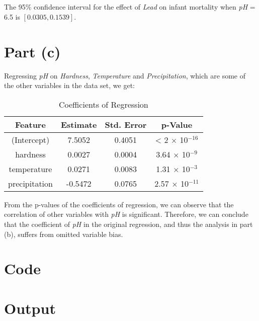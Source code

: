 \documentclass{./solution}
\begin{document}
\begin{solution}
            \subsection{}
                The 95\% confidence interval for the effect of \textit{Lead} on infant mortality when \textit{pH} = 6.5 is $[0.0305, 0.1539]$.

        \section{Part (c)}
            Regressing \textit{pH} on \textit{Hardness}, \textit{Temperature} and \textit{Precipitation}, which are some of the other variables in the data set, we get:

            \begin{table}[H]
                \caption{Coefficients of Regression}
                \begin{tabularx}{\textwidth}{C C C C}
                    \toprule
                    Feature & Estimate & Std. Error & p-Value \\
                    \midrule
                    (Intercept)   &  7.5052 & 0.4051 &  < 2 $\times$ 10$^{-16}$ \\
                    hardness      &  0.0027 & 0.0004 & 3.64 $\times$ 10$^{-9}$ \\
                    temperature   &  0.0271 & 0.0083 & 1.31 $\times$ 10$^{-3}$ \\
                    precipitation & -0.5472 & 0.0765 & 2.57 $\times$ 10$^{-11}$ \\
                    \bottomrule
                \end{tabularx}
            \end{table}

            From the p-values of the coefficients of regression, we can observe that the correlation of other variables with \textit{pH} is significant.
            Therefore, we can conclude that the coefficient of \textit{pH} in the original regression, and thus the analysis in part (b), suffers from omitted variable bias.

        \section{Code}

        \section{Output}
    \end{solution}
\end{document}
